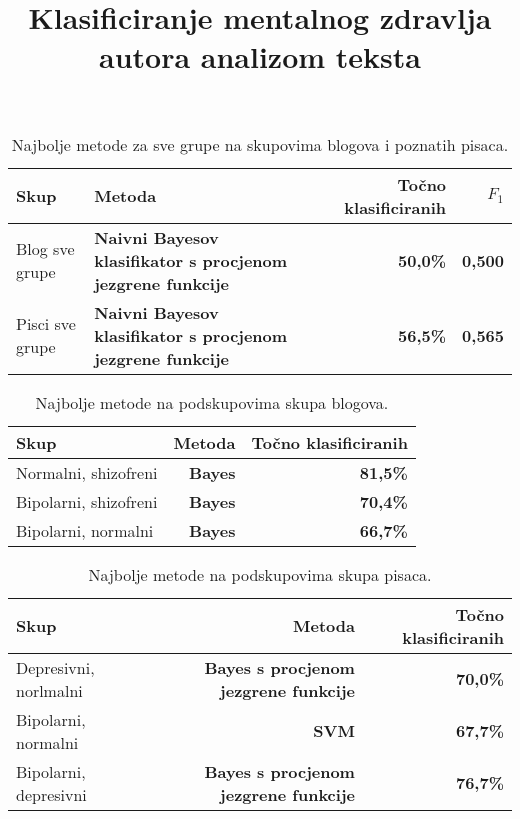 \documentclass[10pt, a4paper]{article}
\title{Klasificiranje mentalnog zdravlja autora analizom teksta }
\begin{document}
\begin{table*}
\label{tab:prva}
\caption{Najbolje metode za sve grupe na skupovima blogova i poznatih pisaca.}
\begin{center}
\begin{tabular}{llrr}
\toprule
Skup & Metoda & Točno klasificiranih & $F_1$ \\
\midrule
Blog sve grupe & 
 \textbf{Naivni Bayesov klasifikator s procjenom jezgrene funkcije}   & \textbf{50,0\%} &  \textbf{0,500}\\
Pisci sve grupe &
 \textbf{Naivni Bayesov klasifikator s procjenom jezgrene funkcije} &  \textbf{56,5\%} & \textbf{0,565}\\
\bottomrule
\end{tabular}
\end{center}
\end{table*}
\begin{table*}
\label{tab:druga}
\caption{Najbolje metode na podskupovima skupa blogova.}
\begin{center}
\begin{tabular}{lrr}
\toprule
Skup & Metoda & Točno klasificiranih\\
\midrule
Normalni, shizofreni & \textbf{Bayes} & \textbf{81,5\%}\\
 Bipolarni, shizofreni &   \textbf{Bayes} &   \textbf{70,4\%}\\
 Bipolarni, normalni & \textbf{Bayes} &  \textbf{66,7\%}\\
 \bottomrule
\end{tabular}
\end{center}
\end{table*}
\begin{table*}
\caption{Najbolje metode na podskupovima skupa pisaca.}
\begin{center}
\begin{tabular}{lrr}
\toprule
Skup & Metoda & Točno klasificiranih\\
\midrule
 Depresivni, norlmalni &  \textbf{Bayes s procjenom jezgrene funkcije} &  \textbf{70,0\%}\\
 Bipolarni, normalni &  \textbf{SVM} &  \textbf{67,7\%}\\
 Bipolarni, depresivni  &  \textbf{Bayes s procjenom jezgrene funkcije} &  \textbf{76,7\%}\\
 \bottomrule
 \end{tabular}
 \end{center}
 \end{table*}
\end{document}
